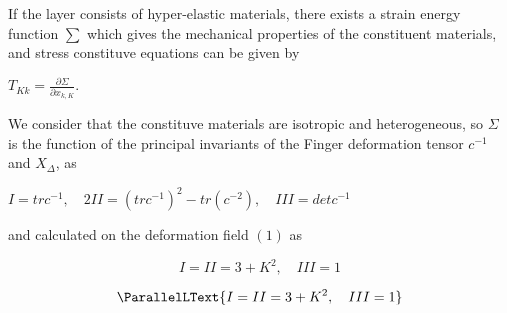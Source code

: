 \documentclass{article}
\begin{document}
\vspace{0.5cm}
If the layer consists of hyper-elastic materials, there exists a strain energy function $\sum$ which gives the mechanical properties of the constituent materials, and stress constituve equations can be given by

\vspace{0.5cm}
$\displaystyle T_{Kk}=\frac{\partial\Sigma}{\partial x_{k,K}}.$

\vspace{0.5cm}
We consider that the constituve materials are isotropic and heterogeneous, so $\Sigma$ is the function of the principal invariants of the Finger deformation tensor $c^{-1}$ and $X_{\Delta}$, as  

\vspace{0.5cm}
$I=trc^{-1},\quad 2II=(trc^{-1})^2-tr(c^{-2}),\quad III=detc^{-1}$

\vspace{0.5cm}
and calculated on the deformation field $(1)$ as

\begin{fleqn}
    \begin{equation}
        I=II=3+K^2,\quad III=1
    \end{equation}
\end{fleqn}


\begin{Parallel}
    \begin{fleqn}
        \begin{equation}
            \ParallelLText{\displaystyle I=II=3+K^2,\quad III=1}
        \end{equation}
    \end{fleqn}
\end{Parallel}
\end{document}
